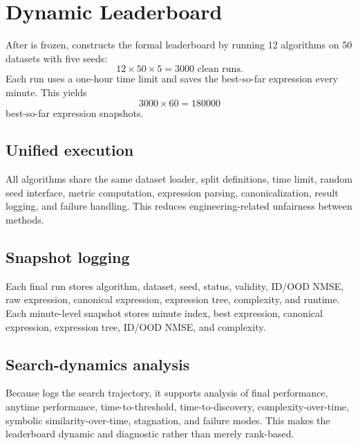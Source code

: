 \section{Dynamic Leaderboard}

After \core{} is frozen, \arena{} constructs the formal leaderboard by running 12 algorithms on 50 datasets with five seeds:
\[
12 \times 50 \times 5 = 3000 \text{ clean runs}.
\]
Each run uses a one-hour time limit and saves the best-so-far expression every minute. This yields
\[
3000 \times 60 = 180000
\]
best-so-far expression snapshots.

\subsection{Unified execution}
All algorithms share the same dataset loader, split definitions, time limit, random seed interface, metric computation, expression parsing, canonicalization, result logging, and failure handling. This reduces engineering-related unfairness between methods.

\subsection{Snapshot logging}
Each final run stores algorithm, dataset, seed, status, validity, ID/OOD NMSE, raw expression, canonical expression, expression tree, complexity, and runtime. Each minute-level snapshot stores minute index, best expression, canonical expression, expression tree, ID/OOD NMSE, and complexity.

\subsection{Search-dynamics analysis}
Because \arena{} logs the search trajectory, it supports analysis of final performance, anytime performance, time-to-threshold, time-to-discovery, complexity-over-time, symbolic similarity-over-time, stagnation, and failure modes. This makes the leaderboard dynamic and diagnostic rather than merely rank-based.

